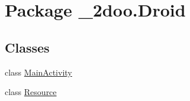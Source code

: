 \hypertarget{namespace__2doo_1_1_droid}{
\section{Package \_\-2doo.Droid}
\label{namespace__2doo_1_1_droid}
}
\subsection*{Classes}
\begin{CompactItemize}
\item 
class \hyperlink{class__2doo_1_1_droid_1_1_main_activity}{MainActivity}
\item 
class \hyperlink{class__2doo_1_1_droid_1_1_resource}{Resource}
\end{CompactItemize}
